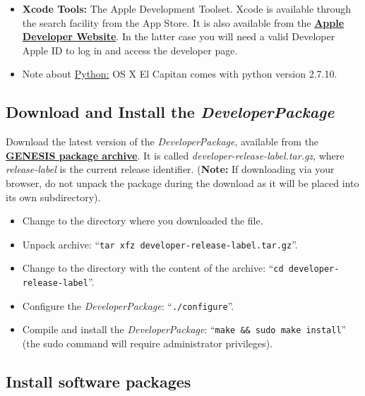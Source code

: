 \documentclass[12pt]{article}
\begin{document}
\begin{itemize}
\item[]{\bf Xcode Tools:} The Apple Development Toolset. Xcode is available through the search facility from the App Store. It is also available from the \href{http://developer.apple.com/technology/xcode.html}{\bf Apple Developer Website}. In the latter case  you will need a valid Developer Apple ID to log in and access the developer page.
   
\item[]Note about \href{http://python.org/}{Python:} OS X El Capitan comes with python version 2.7.10.
\end{itemize}
   

\subsection*{Download and Install the {\it DeveloperPackage}}

Download the latest version of the {\it DeveloperPackage}, available from the \href{http://repo-genesis3.cbi.utsa.edu/src/}{\bf GENESIS package archive}.  It is called {\it developer-release-label.tar.gz}, where {\it release-label} is the current release identifier. ({\bf Note:} If downloading via your browser, do not unpack the package during the download as it will be placed into its own subdirectory).
\begin{itemize}
   \item[] Change to the directory where you downloaded the file.
   \item[] Unpack archive: ``{\tt tar xfz developer-release-label.tar.gz}''.
   \item[] Change to the directory with the content of the archive: ``{\tt cd developer-release-label}''.
   \item[] Configure the {\it DeveloperPackage}: ``{\tt ./configure}''.
   \item[] Compile and install the {\it DeveloperPackage}: ``{\tt make \&\& sudo make install}'' (the sudo command will require administrator privileges).
\end{itemize}


\subsection*{Install software packages}
\end{document}
